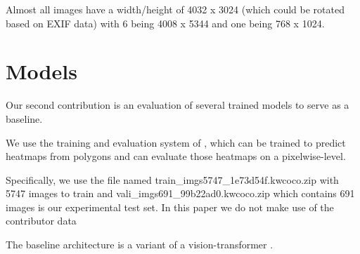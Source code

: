 \documentclass[10pt,twocolumn,letterpaper]{article}
\begin{document}
Almost all images have a width/height of 4032 x 3024 (which could be rotated
based on EXIF data) with 6 being 4008 x 5344 and one being 768 x 1024.


\section{Models}

Our second contribution is an evaluation of several trained models to serve as
a baseline.

We use the training and evaluation system of \cite{Greenwell_2024_WACV}, which
can be trained to predict heatmaps from polygons and can evaluate those
heatmaps on a pixelwise-level. 


Specifically, we use the file named train\_imgs5747\_1e73d54f.kwcoco.zip with
5747 images to train and vali\_imgs691\_99b22ad0.kwcoco.zip which contains 691
images is our experimental test set.
In this paper we do not make use of the contributor data


The baseline architecture is a variant \cite{bertasius2021space,Greenwell_2024_WACV} of a vision-transformer \cite{dosovitskiy_image_2021}.
\end{document}
